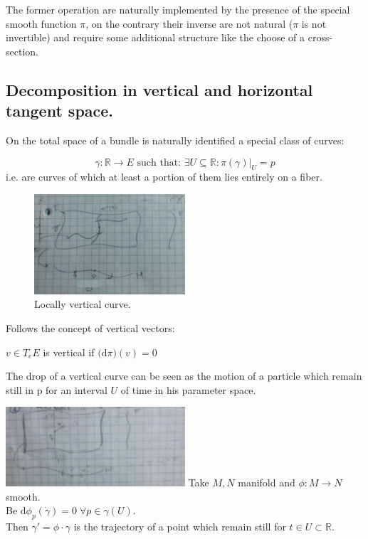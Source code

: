 \documentclass[a4paper,12pt]{scrartcl}    %
\begin{document}
\begin{observation}
The former operation are naturally implemented by the presence of the special smooth function $\pi$, on the contrary their inverse are not natural ($\pi$ is not invertible) and require some additional structure like the choose of a cross-section.
\end{observation}

\subsection{Decomposition in vertical and horizontal tangent space.}
On the total space of a bundle is naturally identified a special class of curves:
\begin{definition}
\begin{displaymath}
\gamma : \mathbb{R}\rightarrow E \textrm{ such that: } \exists U \subseteq \mathbb{R} : \pi(\gamma) \vert_U =p
\end{displaymath}
i.e. are curves of which at least a portion of them lies entirely on a fiber.
\end{definition}

\begin{figure}[h!]
  \caption{Locally vertical curve.}
  	\includegraphics[width=0.5\textwidth]{TempPictures/LocalVerticalCurves.jpg}
  \centering
\end{figure}

Follows the concept of vertical vectors:
\begin{definition}
$v \in T_e E$ is vertical if $\big( \textrm{d}\pi \big) (v) =0$
\end{definition}

\begin{observation}
The drop of a vertical curve can be seen as the motion of a particle which remain still in p for an interval $U$ of time in his parameter space.

  	\includegraphics[width=0.5\textwidth]{TempPictures/DropofVerticalCurve.jpg}
  	Take $M,N$ manifold and  $\phi:M \rightarrow N$ smooth. \\ Be $\textrm{d}\phi_p(\dot{\gamma}) = 0 \; \forall p \in \gamma(U)$.\\ Then $\gamma' = \phi \cdot \gamma$ is the trajectory of a point which remain still for $t \in U \subset \mathbb{R}$.

\end{observation}
\end{document}
